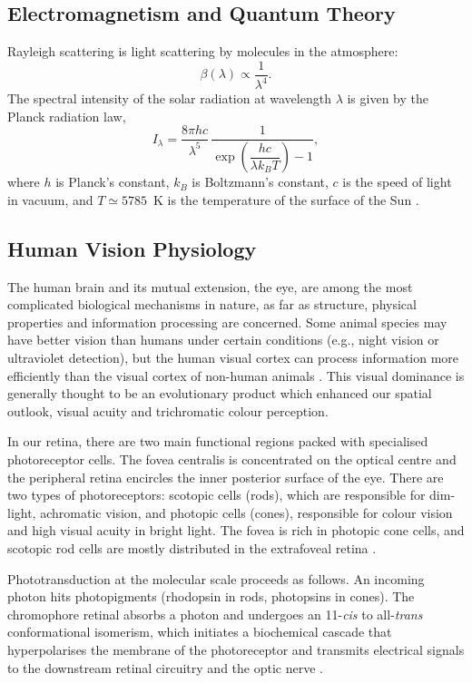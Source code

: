 \documentclass[brainsci,article,submit,moreauthors]{Definitions/mdpi}
\begin{document}
\subsection{Electromagnetism and Quantum Theory}

Rayleigh scattering is light scattering by molecules in the atmosphere:
\begin{equation}
\beta(\lambda) \propto \frac{1}{\lambda^{4}}.
\end{equation}
The spectral intensity of the solar radiation at wavelength $\lambda$ is given by the Planck radiation law,
\begin{equation}
I_{\lambda} = \frac{8\pi h c}{\lambda^{5}}\,\frac{1}{\exp\!\left(\dfrac{hc}{\lambda k_{B} T}\right) - 1},
\end{equation}
where $h$ is Planck's constant, $k_{B}$ is Boltzmann's constant, $c$ is the speed of light in vacuum, and $T \simeq 5785$~K is the temperature of the surface of the Sun \citep{shankar1994,griffiths2017}.

\subsection{Human Vision Physiology}

The human brain and its mutual extension, the eye, are among the most complicated biological mechanisms in nature, as far as structure, physical properties and information processing are concerned. Some animal species may have better vision than humans under certain conditions (e.g., night vision or ultraviolet detection), but the human visual cortex can process information more efficiently than the visual cortex of non-human animals \citep{hubel1977,vanessen1992}. This visual dominance is generally thought to be an evolutionary product which enhanced our spatial outlook, visual acuity and trichromatic colour perception.

In our retina, there are two main functional regions packed with specialised photoreceptor cells. The fovea centralis is concentrated on the optical centre and the peripheral retina encircles the inner posterior surface of the eye. There are two types of photoreceptors: scotopic cells (rods), which are responsible for dim-light, achromatic vision, and photopic cells (cones), responsible for colour vision and high visual acuity in bright light. The fovea is rich in photopic cone cells, and scotopic rod cells are mostly distributed in the extrafoveal retina \citep{curcio1990}.

Phototransduction at the molecular scale proceeds as follows. An incoming photon hits photopigments (rhodopsin in rods, photopsins in cones). The chromophore retinal absorbs a photon and undergoes an 11-\textit{cis} to all-\textit{trans} conformational isomerism, which initiates a biochemical cascade that hyperpolarises the membrane of the photoreceptor and transmits electrical signals to the downstream retinal circuitry and the optic nerve \citep{pugh1993,baylor1996}.
\end{document}
